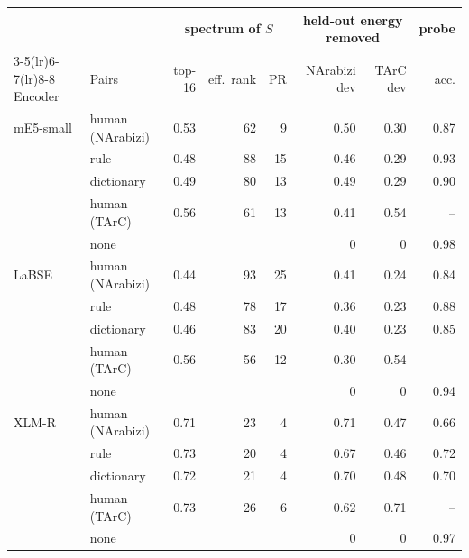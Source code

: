 \begin{tabular}{ll rrr rrr}
\toprule
 & & \multicolumn{3}{c}{spectrum of $S$} & \multicolumn{2}{c}{held-out energy removed} & probe \\
\cmidrule(lr){3-5}\cmidrule(lr){6-7}\cmidrule(lr){8-8}
Encoder & Pairs & top-16 & eff.\ rank & PR & NArabizi dev & TArC dev & acc. \\
\midrule
mE5-small & human (NArabizi) & 0.53 & 62 & 9 & 0.50 & 0.30 & 0.87 \\
 & rule & 0.48 & 88 & 15 & 0.46 & 0.29 & 0.93 \\
 & dictionary & 0.49 & 80 & 13 & 0.49 & 0.29 & 0.90 \\
 & human (TArC) & 0.56 & 61 & 13 & 0.41 & 0.54 & -- \\
 & none & & & & 0 & 0 & 0.98 \\
\midrule
LaBSE & human (NArabizi) & 0.44 & 93 & 25 & 0.41 & 0.24 & 0.84 \\
 & rule & 0.48 & 78 & 17 & 0.36 & 0.23 & 0.88 \\
 & dictionary & 0.46 & 83 & 20 & 0.40 & 0.23 & 0.85 \\
 & human (TArC) & 0.56 & 56 & 12 & 0.30 & 0.54 & -- \\
 & none & & & & 0 & 0 & 0.94 \\
\midrule
XLM-R & human (NArabizi) & 0.71 & 23 & 4 & 0.71 & 0.47 & 0.66 \\
 & rule & 0.73 & 20 & 4 & 0.67 & 0.46 & 0.72 \\
 & dictionary & 0.72 & 21 & 4 & 0.70 & 0.48 & 0.70 \\
 & human (TArC) & 0.73 & 26 & 6 & 0.62 & 0.71 & -- \\
 & none & & & & 0 & 0 & 0.97 \\
\bottomrule
\end{tabular}
